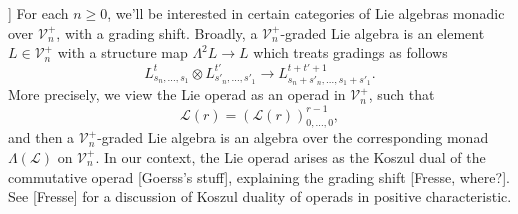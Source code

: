 \documentclass[11pt]{amsart}
\theoremstyle{plain}
\theoremstyle{definition}
\DeclareMathOperator{\im}{im}
\renewcommand{\to}{\longrightarrow}
\newcommand{\scrL}{\mathscr{L}}
\newcommand{\calV}{\mathcal{V}}
\theoremstyle{plain}
\newcommand{\LieOperad}{{\scrL}}
\newcommand{\vect}[2]{\calV^{#1}_{#2}}
\begin{document}
\begin{Lie algebras in characteristic 2 and their homotopy operations}
]%
For each $n\geq0$, we'll be interested in certain categories of Lie algebras monadic over $\vect{+}{n}$, with a grading shift. Broadly, a $\vect{+}{n}$-graded Lie algebra is an element $L\in\vect{+}{n}$ with a structure map $\Lambda^2 L\to L$ which treats gradings as follows
\[L^{t}_{s_n,\ldots,s_1}\otimes L^{t'}_{s'_n,\ldots,s'_1}\to L^{t+t'+1}_{s_n+s'_n,\ldots,s_1+s'_1}.\]
More precisely, we view the Lie operad as an operad in $\vect{+}{n}$, such that
\[\LieOperad(r)=(\LieOperad(r))^{r-1}_{0,\ldots,0},\]
and then a $\vect{+}{n}$-graded Lie algebra is an algebra over the corresponding monad $\Lambda(\LieOperad)$ on $\vect{+}{n}$. In our context, the Lie operad arises as the Koszul dual of the commutative operad [Goerss's stuff], explaining the grading shift [Fresse, where?]. See [Fresse] for a discussion of Koszul duality of operads in positive characteristic.


\end{Lie algebras in characteristic 2 and their homotopy operations}
\end{document}
